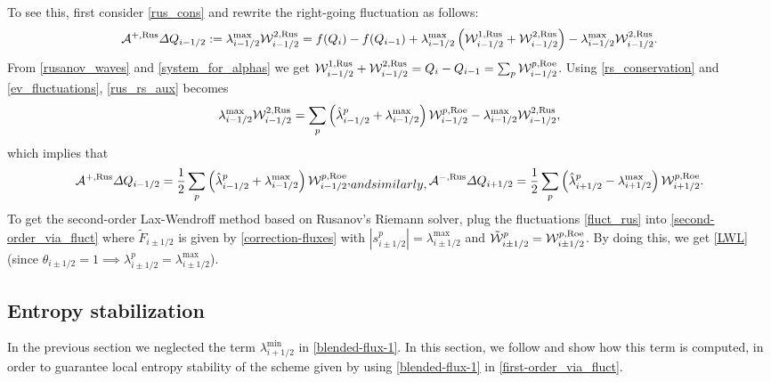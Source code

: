 \documentclass[preprint, 11pt]{article}
\newcommand{\W}{{\mathcal W}}
\newcommand{\A}{{\mathcal A}}
\newcommand{\iph}{{i+1/2}}
\newcommand{\bff}{{f}}
\newcommand{\bfq}{{Q}}
\newcommand{\Rus}{{\rm Rus}}
\newcommand{\Roe}{{\rm Roe}}
\begin{document}
To see this, first consider \eqref{rus_cons} and rewrite the right-going fluctuation as follows:
\begin{align}\label{rus_rs_aux}
  \A^{+,\Rus}\Delta Q_{i-1/2}:=\lambda_{i-1/2}^{\max}\W_{i-1/2}^{2,\Rus}
  = \bff(\bfq_{i})-\bff(\bfq_{i-1}) + \lambda_{i-1/2}^{\max}\left(\W_{i-1/2}^{1,\Rus}+\W_{i-1/2}^{2,\Rus}\right)
  -\lambda_{i-1/2}^{\max}\W_{i-1/2}^{2,\Rus}.
\end{align}
From \eqref{rusanov_waves} and \eqref{system_for_alphas} we get
$\W^{1,\Rus}_{i-1/2}+\W^{2,\Rus}_{i-1/2}=\bfq_i-\bfq_{i-1}=\sum_p\W_{i-1/2}^{p,\Roe}$.
Using \eqref{rs_conservation} and \eqref{ev_fluctuations}, \eqref{rus_rs_aux} becomes
\begin{align*}
  \lambda_{i-1/2}^{\max}\W_{i-1/2}^{2,\Rus}
  = \sum_p \left(\hat \lambda_{i-1/2}^p + \lambda_{i-1/2}^{\max}\right)\W_{i-1/2}^{p,\Roe}
  -\lambda_{i-1/2}^{\max}\W_{i-1/2}^{2,\Rus},
\end{align*}
which implies that
\begin{subequations}\label{fluct_rus}
\begin{align} 
  \A^{+,\Rus}\Delta Q_{i-1/2}=\frac{1}{2}\sum_p\left(\hat \lambda_{i-1/2}^p + \lambda_{i-1/2}^{\max}\right)\W_{i-1/2}^{p,\Roe},
\end{align}
and similarly,
\begin{align}
  \A^{-,\Rus}\Delta Q_{i+1/2}=\frac{1}{2}\sum_p\left(\hat \lambda_{i+1/2}^p - \lambda_{i+1/2}^{\max}\right)\W_{i+1/2}^{p,\Roe}.
\end{align}
\end{subequations}
To get the second-order Lax-Wendroff method based on Rusanov's Riemann solver,
plug the fluctuations \eqref{fluct_rus} into \eqref{second-order_via_fluct} where 
$\tilde F_{i\pm 1/2}$ is given by \eqref{correction-fluxes} with $|s^p_{i\pm 1/2}|=\lambda_{i\pm 1/2}^{\max}$ and $\tilde\W^p_{i\pm 1/2}=\W_{i\pm 1/2}^{p,\Roe}$.
By doing this, we get \eqref{LWL} (since $\theta_{i\pm 1/2}=1 \implies \lambda_{i\pm 1/2}^p=\lambda_{i\pm 1/2}^{\max}$).

\subsection{Entropy stabilization}\label{sec:entropy_stable}
In the previous section we neglected the term $\lambda^{\min}_\iph$ in
\eqref{blended-flux-1}.  In this section, we follow \cite{kuzmin2020algebraic}
and show how this term is computed, in order to guarantee local entropy stability
of the scheme given by using \eqref{blended-flux-1} in \eqref{first-order_via_fluct}.
\end{document}
